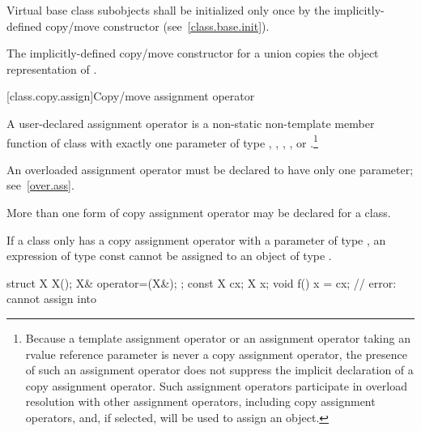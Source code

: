 %
Virtual base class subobjects shall be initialized only once by
the implicitly-defined copy/move constructor (see~\ref{class.base.init}).

\pnum
The implicitly-defined copy/move constructor for a union
 copies the object representation of .%
%

[class.copy.assign]{Copy/move assignment operator}%

\pnum
{}%
%
%
%
%
%
%
A user-declared  assignment operator  is a
non-static non-template member function of class  with exactly one
parameter of type , , ,
, or .\footnote{Because
a template assignment operator or an assignment operator
taking an rvalue reference parameter is never a copy assignment operator,
the presence of such an assignment operator does not suppress the
implicit declaration of a copy assignment operator. Such assignment operators
participate in overload resolution with other assignment operators, including
copy assignment operators, and, if selected, will be used to assign an object.}
\begin{note}
An overloaded assignment operator must be declared to have only one parameter;
see~\ref{over.ass}.
\end{note}
\begin{note}
More than one form of copy assignment operator may be declared for a class.
\end{note}
\begin{note}
If a class
only has a copy assignment operator with a parameter of type
,
an expression of type const
cannot be assigned to an object of type
.
\begin{example}

\begin{codeblock}
struct X {
  X();
  X& operator=(X&);
};
const X cx;
X x;
void f() {
  x = cx;           // error:  cannot assign  into 
}
\end{codeblock}
\end{example}
\end{note}

